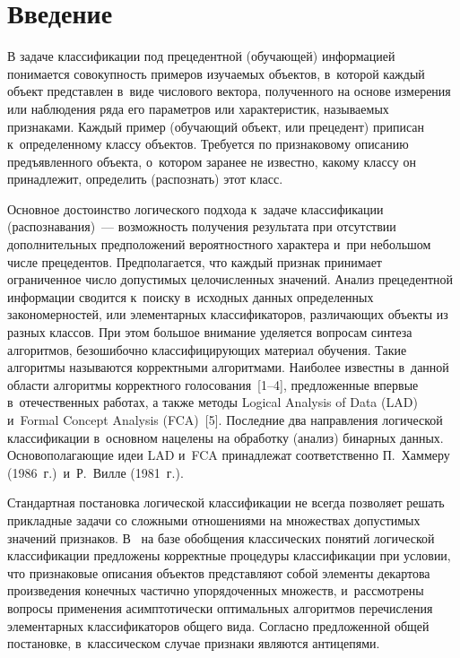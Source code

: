   



\thispagestyle{headings}

\begin{multicols}{2}

\label{st\stat}
     
\section{Введение}

\vspace*{-2pt}

  В задаче классификации под прецедентной (обучающей) информацией 
понимается совокупность примеров изучаемых объектов, в~которой каж\-дый 
объект представлен в~виде числового вектора, полученного на основе 
измерения или наблюдения ряда его параметров или характеристик, 
называемых признаками. Каждый пример (обучающий объект, или прецедент) 
приписан к~определенному классу объектов. Требуется по признаковому 
описанию предъявленного объекта, о~котором заранее не известно, какому 
классу он принадлежит, определить (распознать) этот класс.
  
  Основное достоинство логического подхода к~задаче классификации 
(распознавания)~--- воз\-мож\-ность получения результата при отсутствии 
дополнительных предположений вероятностного характера и~при небольшом 
числе прецедентов. \mbox{Предполагается}, что каж\-дый признак принимает 
ограниченное число допустимых целочисленных значений. Анализ 
прецедентной информации сводится к~поиску в~исходных данных 
определенных закономерностей, или элементарных классификаторов, 
различающих объекты из разных классов. При этом большое внимание 
уделяется вопросам синтеза алгоритмов, безошибочно классифицирующих 
материал обучения. Такие алгоритмы называются корректными алгоритмами. 
Наиболее известны в~данной области алгоритмы корректного 
 голосования~[1--4], предложенные впервые в~отечественных работах, а также 
методы Logical Analysis of Data (LAD) и~Formal Concept Analysis (FCA)~[5]. 
Последние два направления логической классификации в~основном нацелены 
на обработку (анализ) бинарных данных. Основополагающие идеи LAD и~FCA 
принадлежат соответственно П.~Хаммеру (1986~г.)\ и~Р.~Вилле (1981~г.).
  
  Стандартная постановка логической классификации не всегда позволяет 
решать прикладные задачи со сложными отношениями на множествах 
допустимых значений признаков. В~\cite{2-duk, 6-duk} на базе обобщения 
классических понятий логической классификации предложены корректные 
процедуры классификации при условии, что признаковые описания объектов 
представляют собой элементы декартова произведения конечных частично 
упорядоченных множеств, и~рассмотрены вопросы применения асимптотически 
оптимальных алгоритмов перечисления элементарных классификаторов общего 
вида. Согласно предложенной общей постановке, в~классическом случае 
признаки являются антицепями. 
  

\end{multicols}
